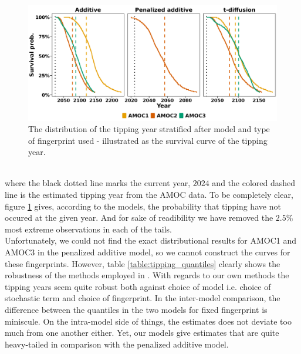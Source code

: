 \begin{figure}[h!]
    \begin{center}
        \includegraphics[scale = .096]{figures/surival_curve_first97.5.jpeg}
        \caption{The distribution of the tipping year stratified after model and type of fingerprint used - illustrated as the survival curve of the tipping year.}
        \label{figure:surival_curve_taus}
    \end{center}
\end{figure}\\
where the black dotted line marks the current year, $2024$ and the colored dashed line is the estimated tipping year from the AMOC data. To be completely clear, figure \ref{figure:surival_curve_taus} gives, according to the models, the probability that tipping have not occured at the given year. And for sake of readibility we have removed the $2.5\%$ most extreme observations in each of the tails.\\
 Unfortunately, we could not find the exact distributional results for AMOC1 and AMOC3 in the penalized additive model, so we cannot construct the curves for these fingerprints. However, table \ref{table:tipping_quantiles} clearly shows the robustness of the methods employed in \cite{Ditlevsen2023}. With regards to our own methods the tipping years seem quite robust both against choice of model i.e. choice of stochastic term and choice of fingerprint. In the inter-model comparison, the difference between the quantiles in the two models for fixed fingerprint is miniscule. On the intra-model side of things, the estimates does not deviate too much from one another either. Yet, our models give estimates that are quite heavy-tailed in comparison with the penalized additive model. 
